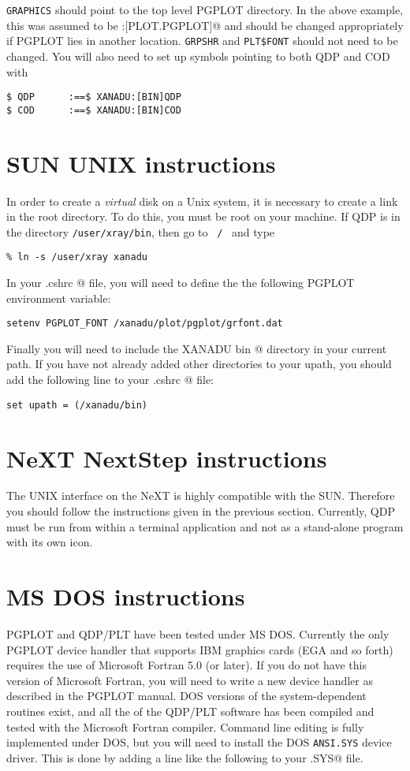 {\tt GRAPHICS} should point to the top level PGPLOT directory.
In the above example,
this was assumed to be \verb@XANADU:[PLOT.PGPLOT]@
and should be changed appropriately if PGPLOT lies in another location.
{\tt GRPSHR} and {\tt PLT\$FONT} should not need to be changed.
You will also need to set up symbols pointing to both QDP and COD with
\begin{verbatim}
$ QDP      :==$ XANADU:[BIN]QDP
$ COD      :==$ XANADU:[BIN]COD
\end{verbatim}

\section{SUN UNIX instructions}
In order to create a {\em virtual} disk on a Unix system,
it is necessary to create a link in the root directory.
To do this, you must be root on your machine.
If QDP is in the directory {\tt /user/xray/bin},
then go to \, {\tt /} \, and type
\begin{verbatim}
% ln -s /user/xray xanadu
\end{verbatim}

In your \verb@ .cshrc @ file,
you will need to define the the following PGPLOT environment variable:
\begin{verbatim}
setenv PGPLOT_FONT /xanadu/plot/pgplot/grfont.dat
\end{verbatim}
Finally you will need to include the XANADU \verb@ bin @ directory
in your current path.
If you have not already added other directories to your upath,
you should add the following line to your \verb@ .cshrc @ file:
\begin{verbatim}
set upath = (/xanadu/bin)
\end{verbatim}

\section{NeXT NextStep instructions}
The UNIX interface on the NeXT is highly compatible with the SUN.
Therefore you should follow the instructions given in the previous
section.
Currently, QDP must be run from within a terminal application and
not as a stand-alone program with its own icon.

\section{MS DOS instructions}
PGPLOT and QDP/PLT have been tested under MS DOS.
Currently the only PGPLOT device handler that supports IBM graphics
cards (EGA and so forth) requires the use of Microsoft Fortran 5.0 (or later).
If you do not have this version of Microsoft Fortran,
you will need to write a new device handler as described in the PGPLOT
manual.
DOS versions of the system-dependent routines exist,
and all the of the QDP/PLT software has been compiled and tested
with the Microsoft Fortran compiler.
Command line editing is fully implemented under DOS,
but you will need to install the DOS {\tt ANSI.SYS} device driver.
This is done by adding a line like the following to your
\verb@CONFIG.SYS@ file.

